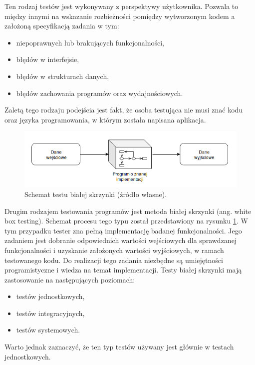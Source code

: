 Ten rodzaj testów jest wykonywany z perspektywy użytkownika.
Pozwala to między innymi na wskazanie rozbieżności pomiędzy wytworzonym kodem a założoną specyfikacją zadania w tym:
\begin {itemize}
\item niepoprawnych lub brakujących funkcjonalności,
\item błędów w interfejsie,
\item błędów w strukturach danych,
\item błędów zachowania programów oraz wydajnościowych.
\end{itemize}
Zaletą tego rodzaju podejścia jest fakt, że osoba testująca nie musi znać kodu oraz języka programowania, w którym została napisana aplikacja.

\begin{figure}[h]
    \centering
    \includegraphics[width = 13cm]{chapter01/white-box.png}
    \caption{Schemat testu białej skrzynki (źródło własne).}
    \label{fig:white-box}
\end{figure}

Drugim rodzajem testowania programów jest metoda białej skrzynki (ang. white box testing).
Schemat procesu tego typu został przedstawiony na rysunku \ref{fig:white-box}.
W tym przypadku tester zna pełną implementację badanej funkcjonalności.
Jego zadaniem jest dobranie odpowiednich wartości wejściowych dla sprawdzanej funkcjonalności i uzyskanie założonych wartości wyjściowych, w ramach testowanego kodu.
Do realizacji tego zadania niezbędne są umiejętności programistyczne i wiedza na temat implementacji.
Testy białej skrzynki mają zastosowanie na następujących poziomach:
\begin{itemize}
\item testów jednostkowych,
\item testów integracyjnych,
\item testów systemowych.
\end{itemize}
Warto jednak zaznaczyć, że ten typ testów używany jest głównie w testach jednostkowych.

